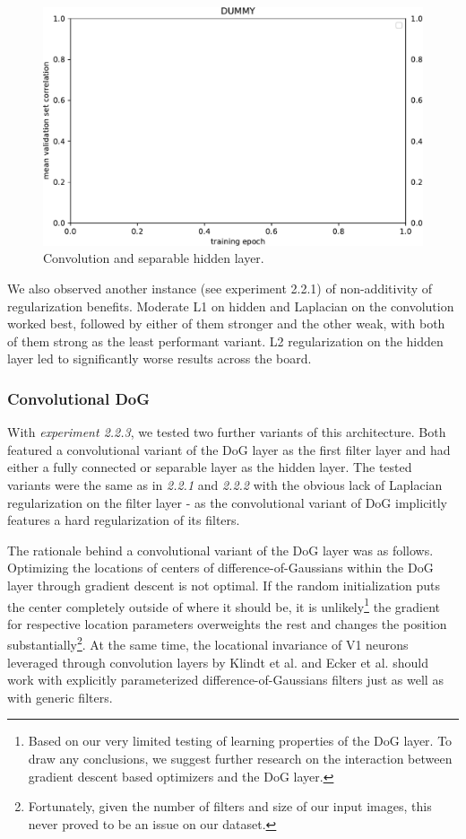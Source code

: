 \begin{figure}[H]
    \centering
    \includegraphics[width=1\textwidth]{../figures/05_dummy}
    \caption[Experiment 2.2.2]{Convolution and separable hidden layer.}
    \label{fig:5.2.2.2}
\end{figure}

We also observed another instance (see experiment 2.2.1) of non-additivity of regularization benefits. Moderate L1 on hidden and Laplacian on the convolution worked best, followed by either of them stronger and the other weak, with both of them strong as the least performant variant. L2 regularization on the hidden layer led to significantly worse results across the board.

\subsubsection{Convolutional DoG}

With \textit{experiment 2.2.3}, we tested two further variants of this architecture. Both featured a convolutional variant of the DoG layer as the first filter layer and had either a fully connected or separable layer as the hidden layer. The tested variants were the same as in \textit{2.2.1} and \textit{2.2.2} with the obvious lack of Laplacian regularization on the filter layer - as the convolutional variant of DoG implicitly features a hard regularization of its filters.

The rationale behind a convolutional variant of the DoG layer was as follows. Optimizing the locations of centers of difference-of-Gaussians within the DoG layer through gradient descent is not optimal. If the random initialization puts the center completely outside of where it should be, it is unlikely\footnote{Based on our very limited testing of learning properties of the DoG layer. To draw any conclusions, we suggest further research on the interaction between gradient descent based optimizers and the DoG layer.} the gradient for respective location parameters overweights the rest and changes the position substantially\footnote{Fortunately, given the number of filters and size of our input images, this never proved to be an issue on our dataset.}. At the same time, the locational invariance of V1 neurons leveraged through convolution layers by Klindt et al. and Ecker et al. should work with explicitly parameterized difference-of-Gaussians filters just as well as with generic filters.

